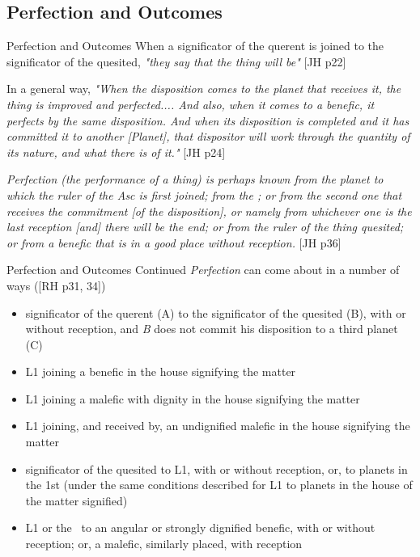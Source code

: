 \subsection{Perfection and Outcomes}
\begin{frame}[t]{Perfection and Outcomes}
When a significator of the querent is joined to the significator of the quesited, \textsl{"they say that the thing will be"} [JH p22]

In a general way, \textsl{"When the disposition comes to the planet that receives it, the thing is improved and perfected.... And also, when it comes to a benefic, it perfects by the same disposition. And when its disposition is completed and it has committed it to another [Planet], that dispositor will work through the quantity of its nature, and what there is of it."} [JH p24]

\begin{block}{}
\textsl{Perfection (the performance of a thing) is perhaps known from the planet to which the ruler of the Asc is first joined; from the \Moon; or from the second one that receives the commitment [of the disposition], or namely from whichever one is the last reception [and] there will be the end; or from the ruler of the thing quesited; or from a benefic that is in a good place without reception.} [JH p36]
\end{block}

\end{frame}
\begin{frame}[t]{Perfection and Outcomes Continued}
\textsl{Perfection} can come about in a number of ways ([RH p31, 34])
\small
\begin{itemize}
\item significator of the querent (A) to the significator of the quesited (B), with or without reception, and \textsl{B} does not commit his disposition to a third planet (C)
\item L1 joining a benefic in the house signifying the matter
\item L1 joining a malefic with dignity in the house signifying the matter
\item L1 joining, and received by, an undignified malefic in the house signifying the matter
\item significator of the quesited to L1, with or without reception, or, to planets in the 1st (under the same conditions described for L1 to planets in the house of the matter signified)
\item L1 or the \Moon\ to an angular or strongly dignified benefic, with or without reception; or, a malefic, similarly placed, with reception
\end{itemize}

\end{frame}
